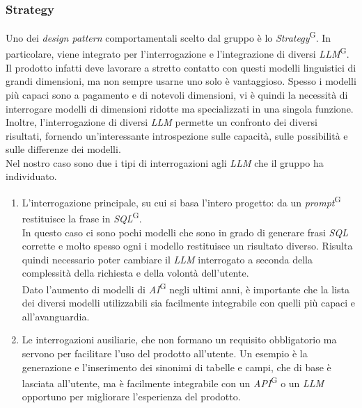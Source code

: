 \documentclass[5pt]{article}
\begin{document}
		\subsubsection{Strategy}
			Uno dei \textit{design pattern} comportamentali scelto dal gruppo è lo \textit{Strategy}\textsuperscript{G}. 
			In particolare, viene integrato per l'interrogazione e l'integrazione di diversi \textit{LLM}\textsuperscript{G}. 
			Il prodotto infatti deve lavorare a stretto contatto con questi modelli linguistici di grandi dimensioni, ma non sempre usarne uno solo è vantaggioso. 
			Spesso i modelli più capaci sono a pagamento e di notevoli dimensioni, vi è quindi la necessità di interrogare modelli di dimensioni ridotte ma specializzati in una singola funzione. 
			Inoltre, l'interrogazione di diversi \textit{LLM} permette un confronto dei diversi risultati, fornendo un'interessante introspezione sulle capacità, sulle possibilità e sulle differenze dei modelli. \\
			Nel nostro caso sono due i tipi di interrogazioni agli \textit{LLM} che il gruppo ha individuato.
			\begin{enumerate}
				\item L'interrogazione principale, su cui si basa l'intero progetto: da un \textit{prompt}\textsuperscript{G} restituisce la frase in \textit{SQL}\textsuperscript{G}. \\
					In questo caso ci sono pochi modelli che sono in grado di generare frasi \textit{SQL} corrette e molto spesso ogni i modello restituisce un risultato diverso. 
					Risulta quindi necessario poter cambiare il \textit{LLM} interrogato a seconda della complessità della richiesta e della volontà dell'utente. \\
					Dato l'aumento di modelli di \textit{AI}\textsuperscript{G} negli ultimi anni, è importante che la lista dei diversi modelli utilizzabili sia facilmente integrabile 
					con quelli più capaci e all'avanguardia.
				\item Le interrogazioni ausiliarie, che non formano un requisito obbligatorio ma servono per facilitare l'uso del prodotto all'utente. 
					Un esempio è la generazione e l'inserimento dei sinonimi di tabelle e campi, che di base è lasciata all'utente, 
					ma è facilmente integrabile con un \textit{API}\textsuperscript{G} o un \textit{LLM} opportuno per migliorare l'esperienza del prodotto.
			\end{enumerate}
	
\end{document}
